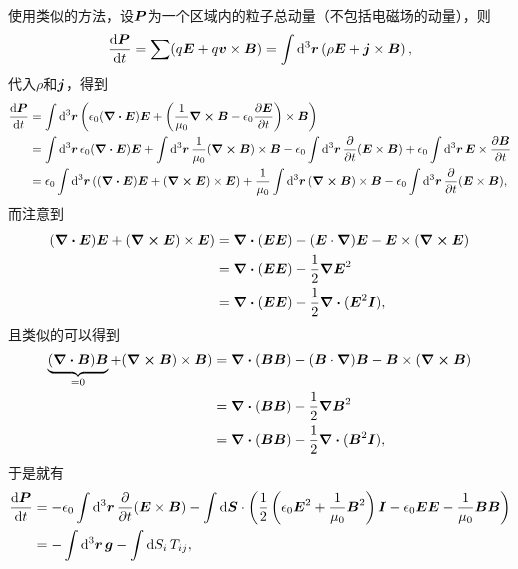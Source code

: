 使用类似的方法，设$\vb*{P}$为一个区域内的粒子总动量（不包括电磁场的动量），则
\[
    \dv{\vb*{P}}{t} = \sum (q \vb*{E} + q \vb*{v} \times \vb*{B}) = \int \dd[3]{\vb*{r}} \left( \rho \vb*{E} + \vb*{j} \times \vb*{B} \right),
\]
代入$\rho$和$\vb*{j}$，得到
\[
    \begin{aligned}
        \dv{\vb*{P}}{t} &= \int \dd[3]{\vb*{r}} \left(\epsilon_0 (\div{\vb*{E}}) \vb*{E} + \left( \frac{1}{\mu_0} \curl{\vb*{B}} - \epsilon_0 \pdv{\vb*{E}}{t} \right) \times \vb*{B} \right) \\
        &= \int \dd[3]{\vb*{r}} \epsilon_0 (\div{\vb*{E}}) \vb*{E} + \int \dd[3]{\vb*{r}} \frac{1}{\mu_0} (\curl{\vb*{B}}) \times \vb*{B} - \epsilon_0 \int \dd[3]{\vb*{r}} \pdv{t} (\vb*{E} \times \vb*{B}) + \epsilon_0 \int \dd[3]{\vb*{r}} \vb*{E} \times \pdv{\vb*{B}}{t} \\
        &= \epsilon_0 \int \dd[3]{\vb*{r}} ((\div{\vb*{E}}) \vb*{E} + (\curl{\vb*{E}}) \times \vb*{E}) + \frac{1}{\mu_0} \int \dd[3]{\vb*{r}} (\curl{\vb*{B}}) \times \vb*{B} - \epsilon_0 \int \dd[3]{\vb*{r}} \pdv{t} (\vb*{E} \times \vb*{B}),
    \end{aligned}
\]
而注意到
\[
    \begin{aligned}
        (\div{\vb*{E}}) \vb*{E} + (\curl{\vb*{E}}) \times \vb*{E}) &= \div{(\vb*{E} \vb*{E})} - (\vb*{E} \cdot \grad) \vb*{E} - \vb*{E} \times (\curl{\vb*{E}}) \\
        &= \div{(\vb*{E} \vb*{E})} - \frac{1}{2} \grad{\vb*{E}^2} \\
        &= \div{(\vb*{E} \vb*{E})} - \frac{1}{2} \div{(\vb*{E}^2 \vb*{I})},
    \end{aligned}
\]
且类似的可以得到
\[
    \begin{aligned}
        \underbrace{(\div{\vb*{B}}) \vb*{B}}_{=0} + (\curl{\vb*{B}}) \times \vb*{B}) &= \div{(\vb*{B} \vb*{B})} - (\vb*{B} \cdot \grad) \vb*{B} - \vb*{B} \times (\curl{\vb*{B}}) \\
        &= \div{(\vb*{B} \vb*{B})} - \frac{1}{2} \grad{\vb*{B}^2} \\
        &= \div{(\vb*{B} \vb*{B})} - \frac{1}{2} \div{(\vb*{B}^2 \vb*{I})},
    \end{aligned}
\]
于是就有
\[
    \begin{aligned}
        \dv{\vb*{P}}{t} &= - \epsilon_0 \int \dd[3]{\vb*{r}} \pdv{t} (\vb*{E} \times \vb*{B}) - \int \dd{\vb*{S}} \cdot \left( \frac{1}{2} \left( \epsilon_0 \vb*{E}^2 + \frac{1}{\mu_0} \vb*{B}^2 \right) \vb*{I} - \epsilon_0 \vb*{E} \vb*{E} - \frac{1}{\mu_0} \vb*{B} \vb*{B} \right) \\
        &= - \int \dd[3]{\vb*{r}} \vb*{g} - \int \dd{S_i} T_{ij},
    \end{aligned}
\]
